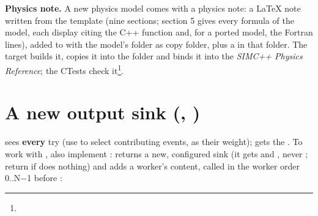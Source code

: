 \textbf{Physics note.} A new physics model comes with a physics note: a LaTeX note written from the template
 (nine sections; section 5 gives every formula of the model, each display
citing the C++ function and, for a ported model, the Fortran lines), added to  with the
model's folder as copy folder, plus a  in that folder. The target  builds it, copies it into the
folder and binds it into the \emph{SIMC++ Physics Reference}; the CTests  check
it\footnote{}.

\section{\texorpdfstring{A new output sink (, )}{A new output sink (IOutputSink,\allowbreak{} IParallelSink)}}\label{developer_manual-04u5fextending:43-a-new-output-sink-ioutputsink-iparallelsink}
 sees \textbf{every} try (use  to select contributing events,  as their weight);  gets
the . To work with , also implement :  returns a new, configured
sink (it gets  and , never ; return  if  does nothing) and  adds a
worker's content, called in the worker order 0..N−1 before :

